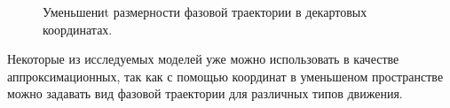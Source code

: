 \documentclass[12pt,twoside]{article}
\begin{document}
\begin{figure}[h]
\caption{Уменьшениt размерности фазовой траектории в декартовых координатах. }
\label{fg:new_traj_1}
\end{figure}

Некоторые из исследуемых моделей уже можно использовать в качестве аппроксимационных, так как с помощью координат в уменьшеном пространстве можно задавать вид фазовой траектории для различных типов движения.
\end{document}
